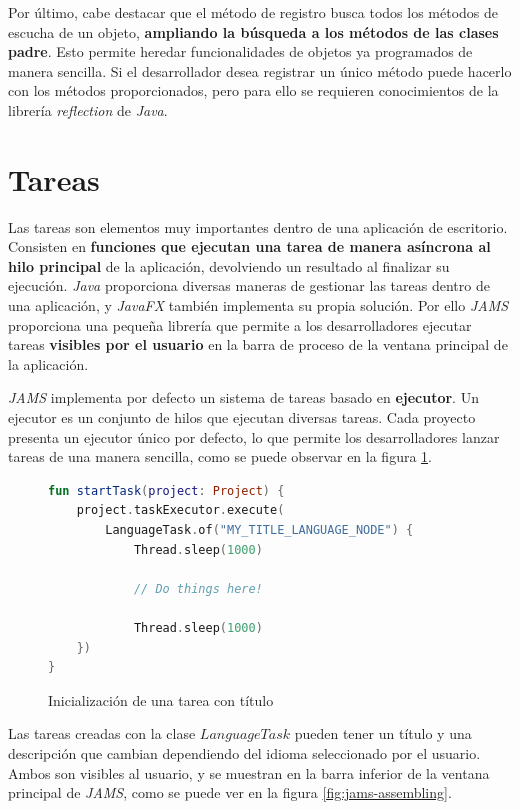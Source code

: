 Por último, cabe destacar que el método de registro
busca todos los métodos de escucha de un objeto,
\textbf{ampliando la búsqueda a los métodos de las clases padre}.
Esto permite heredar funcionalidades de objetos ya programados
de manera sencilla.
Si el desarrollador desea registrar un único método puede hacerlo
con los métodos proporcionados, pero para ello se requieren
conocimientos de la librería \textit{reflection} de \textit{Java}.


\section{Tareas}\label{sec:tareas}

Las tareas son elementos muy importantes dentro de una aplicación
de escritorio.
Consisten en \textbf{funciones que ejecutan una tarea de manera
asíncrona al hilo principal} de la aplicación, devolviendo un
resultado al finalizar su ejecución.
\textit{Java} proporciona diversas maneras de gestionar
las tareas dentro de una aplicación, y \textit{JavaFX}
también implementa su propia solución.
Por ello \textit{JAMS} proporciona una pequeña
librería que permite a los desarrolladores ejecutar
tareas \textbf{visibles por el usuario} en la barra
de proceso de la ventana principal de la aplicación.

\textit{JAMS} implementa por defecto un
sistema de tareas basado en \textbf{ejecutor}.
Un ejecutor es un conjunto de hilos que ejecutan
diversas tareas.
Cada proyecto presenta un ejecutor único por defecto,
lo que permite los desarrolladores lanzar tareas de una
manera sencilla, como se puede observar en la figura \ref{fig:tasks-execution}.

\begin{figure}[h]
    \centering
    \begin{lstlisting}[frame=single,label={lst:tasks-execution},language=Kotlin]
fun startTask(project: Project) {
    project.taskExecutor.execute(
        LanguageTask.of("MY_TITLE_LANGUAGE_NODE") {
            Thread.sleep(1000)

            // Do things here!

            Thread.sleep(1000)
    })
}
    \end{lstlisting}
    \caption{Inicialización de una tarea con título}
    \label{fig:tasks-execution}
\end{figure}

Las tareas creadas con la clase $LanguageTask$
pueden tener un título y una descripción que cambian dependiendo
del idioma seleccionado por el usuario.
Ambos son visibles al usuario, y se muestran
en la barra inferior de la ventana principal de \textit{JAMS},
como se puede ver en la figura \ref{fig:jams-assembling}.

